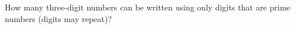 How many three-digit numbers can be written using only digits that are prime numbers (digits may repeat)?
